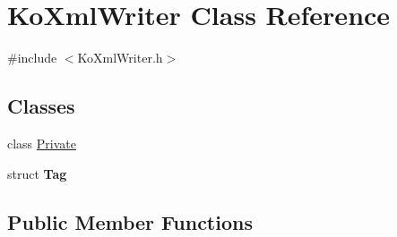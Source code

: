 \hypertarget{classKoXmlWriter}{
\section{KoXmlWriter Class Reference}
\label{classKoXmlWriter}
}


{\ttfamily \#include $<$KoXmlWriter.h$>$}\subsection*{Classes}
\begin{DoxyCompactItemize}
\item 
class \hyperlink{classKoXmlWriter_1_1Private}{Private}
\item 
struct {\bfseries Tag}
\end{DoxyCompactItemize}
\subsection*{Public Member Functions}
